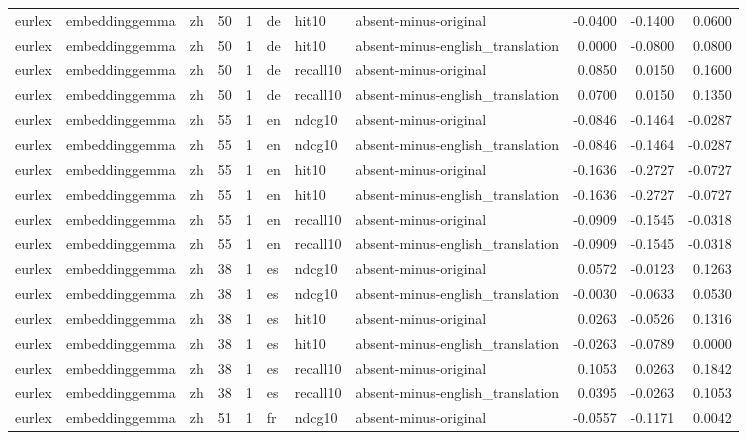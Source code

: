 \begin{tabular}{lllrrlllrrr}
eurlex & embeddinggemma & zh & 50 & 1 & de & hit10 & absent-minus-original & -0.0400 & -0.1400 & 0.0600 \\
eurlex & embeddinggemma & zh & 50 & 1 & de & hit10 & absent-minus-english\_translation & 0.0000 & -0.0800 & 0.0800 \\
eurlex & embeddinggemma & zh & 50 & 1 & de & recall10 & absent-minus-original & 0.0850 & 0.0150 & 0.1600 \\
eurlex & embeddinggemma & zh & 50 & 1 & de & recall10 & absent-minus-english\_translation & 0.0700 & 0.0150 & 0.1350 \\
eurlex & embeddinggemma & zh & 55 & 1 & en & ndcg10 & absent-minus-original & -0.0846 & -0.1464 & -0.0287 \\
eurlex & embeddinggemma & zh & 55 & 1 & en & ndcg10 & absent-minus-english\_translation & -0.0846 & -0.1464 & -0.0287 \\
eurlex & embeddinggemma & zh & 55 & 1 & en & hit10 & absent-minus-original & -0.1636 & -0.2727 & -0.0727 \\
eurlex & embeddinggemma & zh & 55 & 1 & en & hit10 & absent-minus-english\_translation & -0.1636 & -0.2727 & -0.0727 \\
eurlex & embeddinggemma & zh & 55 & 1 & en & recall10 & absent-minus-original & -0.0909 & -0.1545 & -0.0318 \\
eurlex & embeddinggemma & zh & 55 & 1 & en & recall10 & absent-minus-english\_translation & -0.0909 & -0.1545 & -0.0318 \\
eurlex & embeddinggemma & zh & 38 & 1 & es & ndcg10 & absent-minus-original & 0.0572 & -0.0123 & 0.1263 \\
eurlex & embeddinggemma & zh & 38 & 1 & es & ndcg10 & absent-minus-english\_translation & -0.0030 & -0.0633 & 0.0530 \\
eurlex & embeddinggemma & zh & 38 & 1 & es & hit10 & absent-minus-original & 0.0263 & -0.0526 & 0.1316 \\
eurlex & embeddinggemma & zh & 38 & 1 & es & hit10 & absent-minus-english\_translation & -0.0263 & -0.0789 & 0.0000 \\
eurlex & embeddinggemma & zh & 38 & 1 & es & recall10 & absent-minus-original & 0.1053 & 0.0263 & 0.1842 \\
eurlex & embeddinggemma & zh & 38 & 1 & es & recall10 & absent-minus-english\_translation & 0.0395 & -0.0263 & 0.1053 \\
eurlex & embeddinggemma & zh & 51 & 1 & fr & ndcg10 & absent-minus-original & -0.0557 & -0.1171 & 0.0042 \\

\end{tabular}
